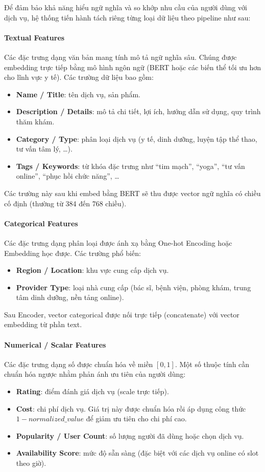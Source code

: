 Để đảm bảo khả năng hiểu ngữ nghĩa và so khớp nhu cầu của người dùng với dịch vụ, hệ thống tiến hành tách riêng từng loại dữ liệu theo pipeline như sau:

\paragraph{Textual Features}
Các đặc trưng dạng văn bản mang tính mô tả ngữ nghĩa sâu. Chúng được embedding trực tiếp bằng mô hình ngôn ngữ (BERT hoặc các biến thể tối ưu hơn cho lĩnh vực y tế). Các trường dữ liệu bao gồm:
\begin{itemize}
    \item \textbf{Name / Title}: tên dịch vụ, sản phẩm.
    \item \textbf{Description / Details}: mô tả chi tiết, lợi ích, hướng dẫn sử dụng, quy trình thăm khám.
    \item \textbf{Category / Type}: phân loại dịch vụ (y tế, dinh dưỡng, luyện tập thể thao, tư vấn tâm lý, \ldots).
    \item \textbf{Tags / Keywords}: từ khóa đặc trưng như ``tim mạch'', ``yoga'', ``tư vấn online'', ``phục hồi chức năng'', \ldots
\end{itemize}

Các trường này sau khi embed bằng BERT sẽ thu được vector ngữ nghĩa có chiều cố định (thường từ 384 đến 768 chiều).

\paragraph{Categorical Features}
Các đặc trưng dạng phân loại được ánh xạ bằng One-hot Encoding hoặc Embedding học được. Các trường phổ biến:
\begin{itemize}
    \item \textbf{Region / Location}: khu vực cung cấp dịch vụ.
    \item \textbf{Provider Type}: loại nhà cung cấp (bác sĩ, bệnh viện, phòng khám, trung tâm dinh dưỡng, nền tảng online).
\end{itemize}

Sau Encoder, vector categorical được nối trực tiếp (concatenate) với vector embedding từ phần text.

\paragraph{Numerical / Scalar Features}
Các đặc trưng dạng số được chuẩn hóa về miền \([0, 1]\). Một số thuộc tính cần chuẩn hóa ngược nhằm phản ánh ưu tiên của người dùng:
\begin{itemize}
    \item \textbf{Rating}: điểm đánh giá dịch vụ (scale trực tiếp).
    \item \textbf{Cost}: chi phí dịch vụ. Giá trị này được chuẩn hóa rồi áp dụng công thức $1 - normalized\_value$ để giảm ưu tiên cho chi phí cao.
    \item \textbf{Popularity / User Count}: số lượng người đã dùng hoặc chọn dịch vụ.
    \item \textbf{Availability Score}: mức độ sẵn sàng (đặc biệt với các dịch vụ online có slot theo giờ).
\end{itemize}


